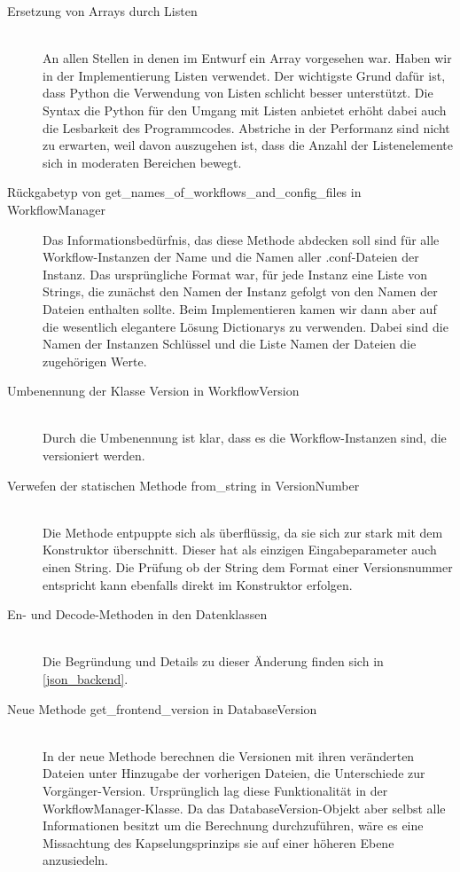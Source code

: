 \begin{description}
\item[Ersetzung von Arrays durch Listen]\hfill \\
An allen Stellen in denen im Entwurf ein Array vorgesehen war. Haben wir in der Implementierung Listen verwendet. Der wichtigste Grund dafür ist, dass Python die Verwendung von Listen schlicht besser unterstützt. Die Syntax die Python für den Umgang mit Listen anbietet erhöht dabei auch die Lesbarkeit des Programmcodes. Abstriche in der Performanz sind nicht zu erwarten, weil davon auszugehen ist, dass die Anzahl der Listenelemente sich in moderaten Bereichen bewegt.
\item[Rückgabetyp von get\_names\_of\_workflows\_and\_config\_files in WorkflowManager]\hfill
Das Informationsbedürfnis, das diese Methode abdecken soll sind für alle Workflow-Instanzen der Name und die Namen aller \glqq .conf\grqq{}-Dateien der Instanz. Das ursprüngliche Format war, für jede Instanz eine Liste von Strings, die zunächst den Namen der Instanz gefolgt von den Namen der Dateien enthalten sollte. Beim Implementieren kamen wir dann aber auf die wesentlich elegantere Lösung Dictionarys zu verwenden. Dabei sind die Namen der Instanzen Schlüssel und die Liste Namen der Dateien die zugehörigen Werte.
\item[Umbenennung der Klasse Version in WorkflowVersion]\hfill \\
Durch die Umbenennung ist klar, dass es die Workflow-Instanzen sind, die versioniert werden.
\item[Verwefen der statischen Methode from\_string in VersionNumber]\hfill \\
Die Methode entpuppte sich als überflüssig, da sie sich zur stark mit dem Konstruktor überschnitt. Dieser hat als einzigen Eingabeparameter auch einen String. Die Prüfung ob der String dem Format einer Versionsnummer entspricht kann ebenfalls direkt im Konstruktor erfolgen.
\item[En- und Decode-Methoden in den Datenklassen]\hfill \\
Die Begründung und Details zu dieser Änderung finden sich in \ref{json_backend}.
\item[Neue Methode get\_frontend\_version in DatabaseVersion]\label{get_f_version}\hfill \\
In der neue Methode berechnen die Versionen mit ihren veränderten Dateien unter Hinzugabe der vorherigen Dateien, die Unterschiede zur Vorgänger-Version. Ursprünglich lag diese Funktionalität in der WorkflowManager-Klasse. Da das DatabaseVersion-Objekt aber selbst alle Informationen besitzt um die Berechnung durchzuführen, wäre es eine Missachtung des Kapselungsprinzips sie auf einer höheren Ebene anzusiedeln.

\end{description}
